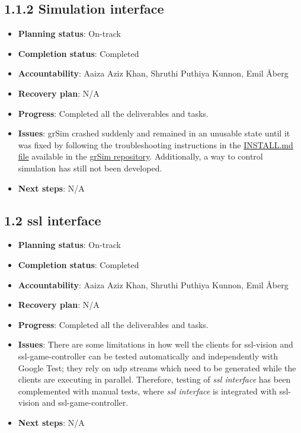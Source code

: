 
\subsection*{1.1.2 Simulation interface}
\begin{itemize}
    \item \textbf{Planning status}: On-track
    \item \textbf{Completion status}: Completed
    \item \textbf{Accountability}: Aaiza Aziz Khan, Shruthi Puthiya Kunnon, Emil Åberg
    \item \textbf{Recovery plan}: N/A
    \item \textbf{Progress}: Completed all the deliverables and tasks.
    \item \textbf{Issues}: grSim crashed suddenly and remained in an unusable state until it was fixed by following the troubleshooting instructions in the \href{https://github.com/RoboCup-SSL/grSim/blob/master/INSTALL.md}{INSTALL.md file} available in the \href{https://github.com/RoboCup-SSL/grSim}{grSim repository}. Additionally, a way to control simulation has still not been developed.
    \item \textbf{Next steps}: N/A
\end{itemize}


\subsection*{1.2 \acs{ssl} interface}
\begin{itemize}
    \item \textbf{Planning status}: On-track
    \item \textbf{Completion status}: Completed
    \item \textbf{Accountability}: Aaiza Aziz Khan, Shruthi Puthiya Kunnon, Emil Åberg
    \item \textbf{Recovery plan}: N/A
    \item \textbf{Progress}: Completed all the deliverables and tasks.
    \item \textbf{Issues}: There are some limitations in how well the clients for ssl-vision and ssl-game-controller can be tested automatically and independently with Google Test; they rely on \ac{udp} streams which need to be generated while the clients are executing in parallel. Therefore, testing of \textit{\acs{ssl} interface} has been complemented with manual tests, where \textit{\acs{ssl} interface} is integrated with ssl-vision and ssl-game-controller.
    \item \textbf{Next steps}: N/A
\end{itemize}

